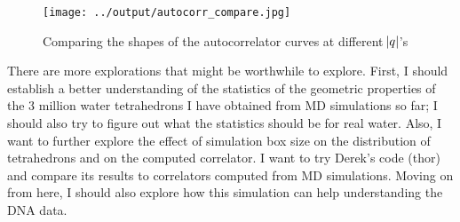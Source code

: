 \documentclass[20pt]{article}
\begin{document}
\begin{figure}[!h]
  \centering
    \texttt{[image: ../output/autocorr\_compare.jpg]}
     \caption{Comparing the shapes of the autocorrelator curves at different $\abs{q}$'s} \label{fig:autocorr_compare}
\end{figure}

There are more explorations that might be worthwhile to explore. First, I should establish a better understanding of the statistics of the geometric properties of the 3 million water tetrahedrons I have obtained from MD simulations so far; I should also try to figure out what the statistics should be for real water. Also, I want to further explore the effect of simulation box size on the distribution of tetrahedrons and on the computed correlator. I want to try Derek's code (thor) and compare its results to correlators computed from MD simulations. Moving on from here, I should also explore how this simulation can help understanding the DNA data.
\end{document}
